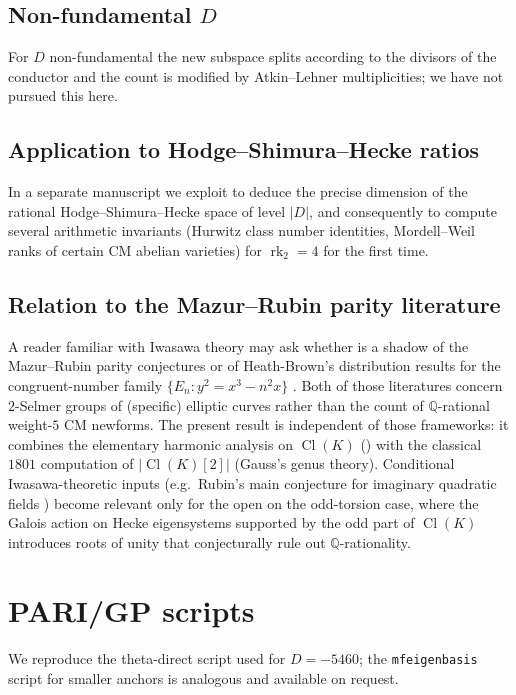 \documentclass[11pt]{amsart}
\theoremstyle{definition}
\theoremstyle{remark}
\DeclareMathOperator{\Cl}{Cl}
\DeclareMathOperator{\rk}{rk}
\newcommand{\Q}{\mathbb{Q}}
\begin{document}
\subsection*{Non-fundamental \(D\)}
For \(D\) non-fundamental the new subspace splits according to the
divisors of the conductor and the count is modified by Atkin--Lehner
multiplicities; we have not pursued this here.

\subsection*{Application to Hodge--Shimura--Hecke ratios}
In a separate manuscript we exploit  to deduce
the precise dimension of the rational Hodge--Shimura--Hecke space of
level \(|D|\), and consequently to compute several arithmetic
invariants (Hurwitz class number identities, Mordell--Weil ranks of
certain CM abelian varieties) for \(\rk_2 = 4\) for the first time.

\subsection*{Relation to the Mazur--Rubin parity literature}
A reader familiar with Iwasawa theory may ask whether 
is a shadow of the Mazur--Rubin parity conjectures \cite{MazurRubin2007}
or of Heath-Brown's distribution results for the congruent-number
family \(\{E_n : y^2 = x^3 - n^2 x\}\) \cite{HeathBrown1994}. Both of
those literatures concern \(2\)-Selmer groups of (specific) elliptic
curves rather than the count of \(\Q\)-rational weight-\(5\) CM
newforms. The present result is independent of those frameworks: it
combines the elementary harmonic analysis on \(\Cl(K)\)
() with the classical \(1801\) computation of
\(|\Cl(K)[2]|\) (Gauss's genus theory). Conditional Iwasawa-theoretic
inputs (e.g.\ Rubin's main conjecture for imaginary quadratic fields
\cite{Rubin1991}) become relevant only for the open
 on the odd-torsion case, where the Galois action on
Hecke eigensystems supported by the odd part of \(\Cl(K)\) introduces
roots of unity that conjecturally rule out \(\Q\)-rationality.

\appendix

\section{PARI/GP scripts}\label{app:scripts}

We reproduce the theta-direct script used for \(D = -5460\); the
\texttt{mfeigenbasis} script for smaller anchors is analogous and
available on request.
\end{document}
